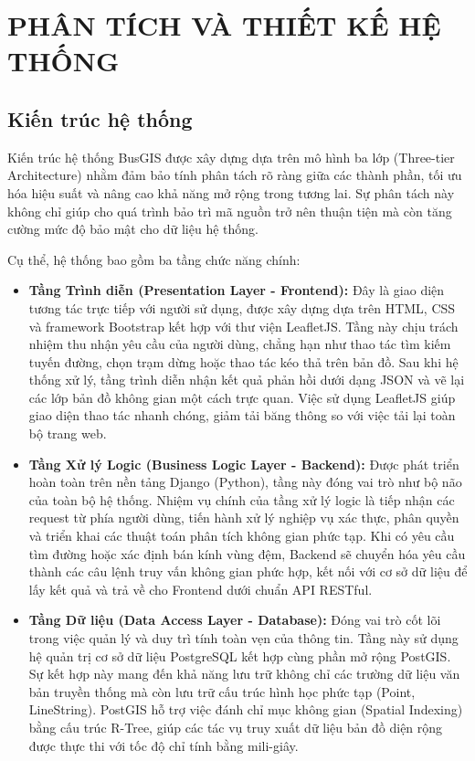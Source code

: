 \chapter{PHÂN TÍCH VÀ THIẾT KẾ HỆ THỐNG}

\section{Kiến trúc hệ thống}

Kiến trúc hệ thống BusGIS được xây dựng dựa trên mô hình ba lớp (Three-tier Architecture) nhằm đảm bảo tính phân tách rõ ràng giữa các thành phần, tối ưu hóa hiệu suất và nâng cao khả năng mở rộng trong tương lai. Sự phân tách này không chỉ giúp cho quá trình bảo trì mã nguồn trở nên thuận tiện mà còn tăng cường mức độ bảo mật cho dữ liệu hệ thống.

Cụ thể, hệ thống bao gồm ba tầng chức năng chính:
\begin{itemize}
    \item \textbf{Tầng Trình diễn (Presentation Layer - Frontend):} Đây là giao diện tương tác trực tiếp với người sử dụng, được xây dựng dựa trên HTML, CSS và framework Bootstrap kết hợp với thư viện LeafletJS. Tầng này chịu trách nhiệm thu nhận yêu cầu của người dùng, chẳng hạn như thao tác tìm kiếm tuyến đường, chọn trạm dừng hoặc thao tác kéo thả trên bản đồ. Sau khi hệ thống xử lý, tầng trình diễn nhận kết quả phản hồi dưới dạng JSON và vẽ lại các lớp bản đồ không gian một cách trực quan. Việc sử dụng LeafletJS giúp giao diện thao tác nhanh chóng, giảm tải băng thông so với việc tải lại toàn bộ trang web.
    \item \textbf{Tầng Xử lý Logic (Business Logic Layer - Backend):} Được phát triển hoàn toàn trên nền tảng Django (Python), tầng này đóng vai trò như bộ não của toàn bộ hệ thống. Nhiệm vụ chính của tầng xử lý logic là tiếp nhận các request từ phía người dùng, tiến hành xử lý nghiệp vụ xác thực, phân quyền và triển khai các thuật toán phân tích không gian phức tạp. Khi có yêu cầu tìm đường hoặc xác định bán kính vùng đệm, Backend sẽ chuyển hóa yêu cầu thành các câu lệnh truy vấn không gian phức hợp, kết nối với cơ sở dữ liệu để lấy kết quả và trả về cho Frontend dưới chuẩn API RESTful.
    \item \textbf{Tầng Dữ liệu (Data Access Layer - Database):} Đóng vai trò cốt lõi trong việc quản lý và duy trì tính toàn vẹn của thông tin. Tầng này sử dụng hệ quản trị cơ sở dữ liệu PostgreSQL kết hợp cùng phần mở rộng PostGIS. Sự kết hợp này mang đến khả năng lưu trữ không chỉ các trường dữ liệu văn bản truyền thống mà còn lưu trữ cấu trúc hình học phức tạp (Point, LineString). PostGIS hỗ trợ việc đánh chỉ mục không gian (Spatial Indexing) bằng cấu trúc R-Tree, giúp các tác vụ truy xuất dữ liệu bản đồ diện rộng được thực thi với tốc độ chỉ tính bằng mili-giây.
\end{itemize}

